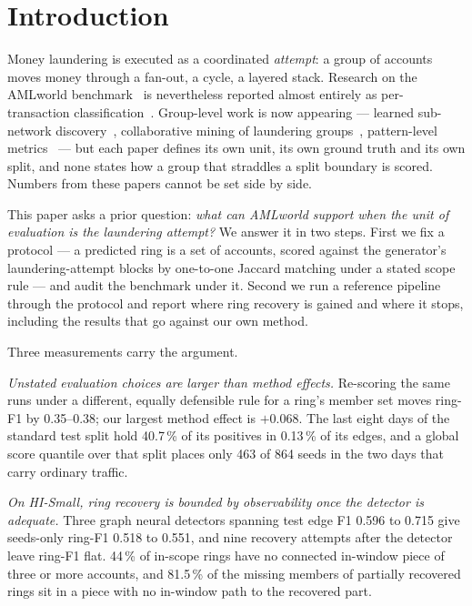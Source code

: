 \section{Introduction}
\label{sec:intro}

Money laundering is executed as a coordinated \emph{attempt}: a group of accounts moves money
through a fan-out, a cycle, a layered stack. Research on the AMLworld
benchmark~\citep{altman2023} is nevertheless reported almost entirely as per-transaction
classification~\citep{egressy2024,lin2024fraudgt,bilgi2024}. Group-level work is now
appearing --- learned sub-network discovery~\citep{chai2023,rico2026}, collaborative mining of
laundering groups~\citep{tian2025}, pattern-level metrics~\citep{tariq2026redirect} --- but
each paper defines its own unit, its own ground truth and its own split, and none states how a
group that straddles a split boundary is scored. Numbers from these papers cannot be set side
by side.

This paper asks a prior question: \emph{what can AMLworld support when the unit of evaluation
is the laundering attempt?} We answer it in two steps. First we fix a protocol --- a predicted
ring is a set of accounts, scored against the generator's laundering-attempt blocks by
one-to-one Jaccard matching under a stated scope rule --- and audit the benchmark under it.
Second we run a reference pipeline through the protocol and report where ring recovery is
gained and where it stops, including the results that go against our own method.

Three measurements carry the argument.

\emph{Unstated evaluation choices are larger than method effects.} Re-scoring the same runs
under a different, equally defensible rule for a ring's member set moves ring-F1 by
0.35--0.38; our largest method effect is $+0.068$.
The last eight days of the standard test split hold 40.7\,\% of its positives in 0.13\,\% of
its edges, and a global score quantile over that split places only 463 of 864 seeds in the two
days that carry ordinary traffic.

\emph{On HI-Small, ring recovery is bounded by observability once the detector is adequate.}
Three graph neural detectors spanning test edge F1 0.596 to 0.715 give seeds-only ring-F1 0.518
to 0.551, and nine recovery attempts after the detector leave ring-F1 flat. 44\,\% of in-scope
rings have no connected in-window piece of three or more accounts, and 81.5\,\% of the missing
members of partially recovered rings sit in a piece with no in-window path to the recovered part.

